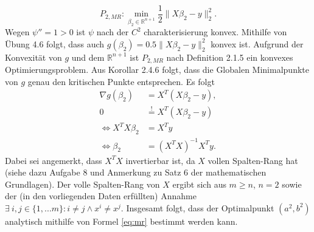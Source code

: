 \documentclass[ngerman, a4paper,12pt]{article}
\begin{document}
\begin{equation*}
	P_{2, MR}:\min_{\beta_2 \in \mathbb{R}^{n+1}} \frac{1}{2} \|X \beta_2 - y \|_2^2.
\end{equation*}
Wegen $\psi''=1>0$ ist $\psi$ nach der $C^2$ charakterisierung konvex. Mithilfe von Übung 4.6 folgt, dass auch $g(\beta_2) = 0.5 \| X \beta_2 - y \|_2^2$ konvex ist. Aufgrund der Konvexität von $g$ und dem $\mathbb{R}^{n+1}$ ist $P_{2,MR}$ nach Definition 2.1.5 ein konvexes Optimierungsproblem. Aus Korollar 2.4.6 folgt, dass die Globalen Minimalpunkte von $g$ genau den kritischen Punkte entsprechen. Es folgt
\begin{equation}
\label{eq:mr}
	\begin{split}
		\nabla g(\beta_2) &= X^T(X\beta_2 -y),\\
		0 &\overset{!}{=} X^T(X\beta_2 -y) \\
		\iff X^TX \beta_2 &= X^Ty \\
		\iff \beta_2	&=	(X^TX)^{-1}X^Ty.
	\end{split}
\end{equation}
Dabei sei angemerkt, dass $X^TX$ invertierbar ist, da $X$ vollen Spalten-Rang hat (siehe dazu Aufgabe 8 und Anmerkung zu Satz 6 der mathematischen Grundlagen). Der volle Spalten-Rang von $X$ ergibt sich aus $m \geq n$, $n=2$ sowie der (in den vorliegenden Daten erfüllten) Annahme $\exists \ i,j \in \{1, ...m \}: i \neq j \wedge x^i \neq x^j$. Insgesamt folgt, dass der Optimalpunkt $(a^2, b^2)$ analytisch mithilfe von Formel \eqref{eq:mr} bestimmt werden kann.\par
\end{document}
